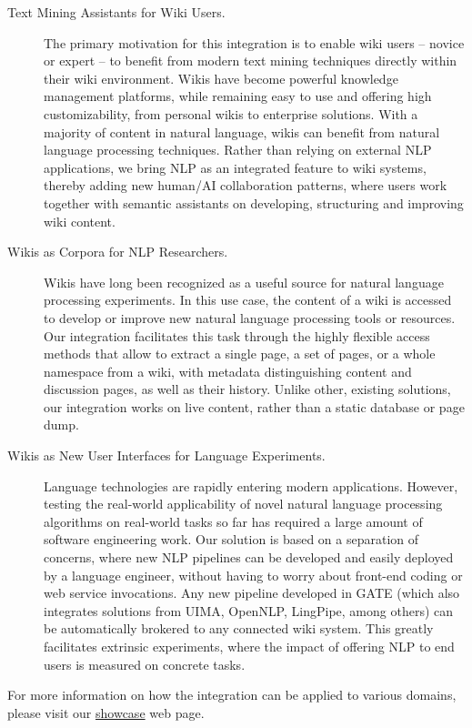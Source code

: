\begin{description}
\item[Text Mining Assistants for Wiki Users.] The primary motivation for this integration is to enable wiki users -- novice or expert -- to benefit from modern text mining techniques directly within their wiki environment. Wikis have become powerful knowledge management platforms, while remaining easy to use and offering high customizability, from personal wikis to enterprise solutions. With a majority of content in natural language, wikis can benefit from natural language processing techniques. Rather than relying on external NLP applications, we bring NLP as an integrated feature to wiki systems, thereby adding new human/AI collaboration patterns, where users work together with semantic assistants on developing, structuring and improving wiki content.
\item[Wikis as Corpora for NLP Researchers.] Wikis have long been recognized as a useful source for natural language processing experiments. In this use case, the content of a wiki is accessed to develop or improve new natural language processing tools or resources. Our integration facilitates this task through the highly flexible access methods that allow to extract a single page, a set of pages, or a whole namespace from a wiki, with metadata distinguishing content and discussion pages, as well as their history. Unlike other, existing solutions, our \wikinlp integration works on live content, rather than a static database or page dump.
\item[Wikis as New User Interfaces for Language Experiments.]Language technologies are rapidly entering modern applications. However, testing the real-world applicability of novel natural language processing algorithms on real-world tasks so far has required a large amount of software engineering work. Our solution is based on a separation of concerns, where new NLP pipelines can be developed and easily deployed by a language engineer, without having to worry about front-end coding or web service invocations. Any new pipeline developed in GATE (which also integrates solutions from UIMA, OpenNLP, LingPipe, among others) can be automatically brokered to any connected wiki system. This greatly facilitates extrinsic experiments, where the impact of offering NLP to end users is measured on concrete tasks.
\end{description}


\noindent
For more information on how the \wikinlp integration can be applied to various domains, please visit our \href{http://www.semanticsoftware.info/semantic-assistants-wiki-nlp-showcase}{showcase} web page.

